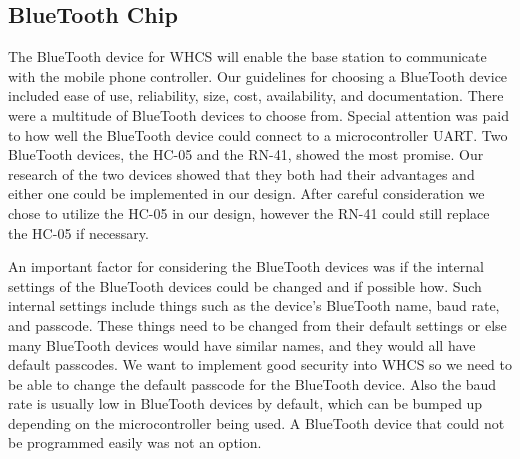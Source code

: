 \subsection{BlueTooth Chip}
The BlueTooth device for WHCS will enable the base station to communicate with
the mobile phone controller. Our guidelines for choosing a BlueTooth device
included ease of use, reliability, size, cost, availability, and documentation.
There were a multitude of BlueTooth devices to choose from. Special attention
was paid to how well the BlueTooth device could connect to a microcontroller
UART. Two BlueTooth devices, the HC{}-05 and the RN{}-41, showed the most
promise. Our research of the two devices showed that they both had their
advantages and either one could be implemented in our design. After careful
consideration we chose to utilize the HC{}-05 in our design, however the
RN{}-41 could still replace the HC{}-05 if necessary.

An important factor for considering the BlueTooth devices was if the internal
settings of the BlueTooth devices could be changed and if possible how. Such
internal settings include things such as the device{}'s BlueTooth name, baud
rate, and passcode. These things need to be changed from their default settings
or else many BlueTooth devices would have similar names, and they would all
have default passcodes. We want to implement good security into WHCS so we need
to be able to change the default passcode for the BlueTooth device. Also the
baud rate is usually low in BlueTooth devices by default, which can be bumped
up depending on the microcontroller being used. A BlueTooth device that could
not be programmed easily was not an option.

